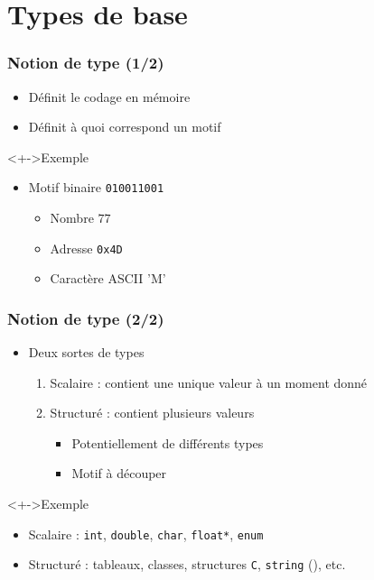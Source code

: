 \section{Types de base}

\begin{frame}
\frametitle{Notion de type (1/2)}
\begin{itemize}[<+->]
\item Définit le codage en mémoire
\item Définit à quoi correspond un motif
\end{itemize}
\begin{exampleblock}<+->{Exemple}
	\begin{itemize}[<+->]
	\item Motif binaire \texttt{010011001}
		\begin{itemize}
		\item Nombre $77$
		\item Adresse \texttt{0x4D}
		\item Caractère ASCII 'M'
		\end{itemize}
	\end{itemize}
\end{exampleblock}
\end{frame}

\begin{frame}
\frametitle{Notion de type (2/2)}
\begin{itemize}[<+->]
\item Deux sortes de types
	\begin{enumerate}
	\item Scalaire : contient une unique valeur à un moment donné
	\item Structuré : contient plusieurs valeurs
		\begin{itemize}
		\item Potentiellement de différents types
		\item Motif à découper
		\end{itemize}
	\end{enumerate}
\end{itemize}
\begin{exampleblock}<+->{Exemple}
	\begin{itemize}
	\item Scalaire : \lstinline|int|, \lstinline|double|, \lstinline|char|, \lstinline|float*|, \lstinline|enum|
	\item Structuré : tableaux, classes, structures \texttt{C}, \texttt{string} (\cpp), etc.
	\end{itemize}
\end{exampleblock}
\end{frame}

